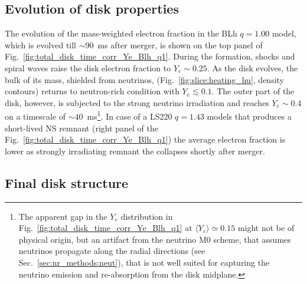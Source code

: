 \subsection{Evolution of disk properties}

The evolution of the mass-weighted electron fraction in the 
BLh $q=1.00$ model, 
which is evolved till $\sim 90$~ms after merger, 
is shown on the top panel of Fig.~\ref{fig:total_disk_time_corr_Ye_Blh_q1}.
%
During the formation, shocks and spiral waves raise the disk electron fraction to
$Y_e\sim0.25$. As the disk evolves, the bulk of its mass, shielded from neutrinos, 
(Fig.~\ref{fig:slice:heating_hu}, density contours) returns to neutron-rich 
condition with $Y_e\lesssim0.1$. The outer part of the disk, however, is 
subjected to the strong neutrino irradiation and reaches $Y_e\sim0.4$ on a 
timescale of ${\sim}40$~ms\footnote{
    The apparent gap in the $Y_e$ distribution in 
    Fig.~\ref{fig:total_disk_time_corr_Ye_Blh_q1} at $\langle Y_e \rangle \simeq 0.15$ 
    might not be of physical origin, but an artifact from the neutrino M0 scheme, 
    that assumes neutrinos propagate along the radial directions
    (see Sec.~\ref{sec:nr_methods:neut}), that is not well suited for capturing the 
    neutrino emission and re-absorption from the disk midplane.
}.
%
In case of a 
LS220 $q=1.43$ models that produces a 
short-lived \ac{NS} remnant  %
(right panel of the Fig.~\ref{fig:total_disk_time_corr_Ye_Blh_q1})
the average electron fraction is lower as strongly irradiating remnant the 
collapses shortly after merger. 
%

%


\subsection{Final disk structure}

